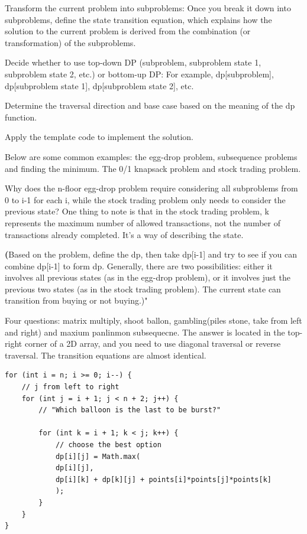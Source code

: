 \documentclass[a4paper,11pt,twoside]{book}
\begin{document}
	Transform the current problem into subproblems: Once you break it down into subproblems, define the state transition equation, which explains how the solution to the current problem is derived from the combination (or transformation) of the subproblems.
	
	Decide whether to use top-down DP (subproblem, subproblem state 1, subproblem state 2, etc.) or bottom-up DP: For example, dp[subproblem], dp[subproblem state 1], dp[subproblem state 2], etc.
	
	Determine the traversal direction and base case based on the meaning of the dp function.
	
	Apply the template code to implement the solution.
	
	
	Below are some common examples: the egg-drop problem, subsequence problems and finding the minimum. The 0/1 knapsack problem and stock trading problem.
	
	Why does the n-floor egg-drop problem require considering all subproblems from 0 to i-1 for each i, while the stock trading problem only needs to consider the previous state?  One thing to note is that in the stock trading problem, k represents the maximum number of allowed transactions, not the number of transactions already completed. It’s a way of describing the state.
	
	\par \textbf(Based on the problem, define the dp, then take dp[i-1] and try to see if you can combine dp[i-1] to form dp. Generally, there are two possibilities: either it involves all previous states (as in the egg-drop problem), or it involves just the previous two states (as in the stock trading problem). The current state can transition from buying or not buying.)"
	
	
	\par Four questions: matrix multiply, shoot ballon, gambling(piles stone, take from left and right) and maxium panlinmon subsequecne. The answer is located in the top-right corner of a 2D array, and you need to use diagonal traversal or reverse traversal. The transition equations are almost identical.
	
\begin{lstlisting}
for (int i = n; i >= 0; i--) {
	// j from left to right
	for (int j = i + 1; j < n + 2; j++) {
		// "Which balloon is the last to be burst?"
		
		for (int k = i + 1; k < j; k++) {
			// choose the best option
			dp[i][j] = Math.max(
			dp[i][j], 
			dp[i][k] + dp[k][j] + points[i]*points[j]*points[k]
			);
		}
	}
}	
\end{lstlisting}	
	
\end{document}
